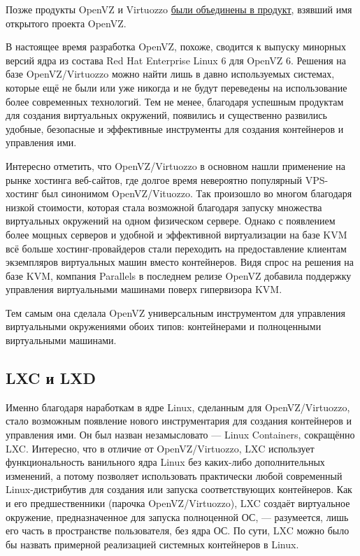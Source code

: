 \documentclass[14pt, a4paper]{article}
\begin{document}
Позже продукты OpenVZ и Virtuozzo \href{https://lists.openvz.org/pipermail/announce/2016-July/000664.html}{были объединены в продукт}, взявший имя открытого проекта
OpenVZ.

В настоящее время разработка OpenVZ, похоже, сводится к выпуску минорных версий ядра из
состава Red Hat Enterprise Linux 6 для OpenVZ 6. Решения на базе OpenVZ/Virtuozzo можно найти
лишь в давно используемых системах, которые ещё не были или уже никогда и не будут переведены
на использование более современных технологий. Тем не менее, благодаря успешным продуктам для
создания виртуальных окружений, появились и существенно развились удобные, безопасные и
эффективные инструменты для создания контейнеров и управления ими.

Интересно отметить, что OpenVZ/Virtuozzo в основном нашли применение на рынке хостинга
веб-сайтов, где долгое время невероятно популярный VPS-хостинг был синонимом OpenVZ/Vituozzo.
Так произошло во многом благодаря низкой стоимости, которая стала возможной благодаря запуску
множества виртуальных окружений на одном физическом сервере. Однако с появлением более
мощных серверов и удобной и эффективной виртуализации на базе KVM всё больше
хостинг-провайдеров стали переходить на предоставление клиентам экземпляров виртуальных
машин вместо контейнеров. Видя спрос на решения на базе KVM, компания Parallels в последнем
релизе OpenVZ добавила поддержку управления виртуальными машинами поверх гипервизора KVM.

Тем самым она сделала OpenVZ универсальным инструментом для управления виртуальными
окружениями обоих типов: контейнерами и полноценными виртуальными машинами.\\

\subsection*{LXC и LXD}

Именно благодаря наработкам в ядре Linux, сделанным для OpenVZ/Virtuozzo, стало возможным
появление нового инструментария для создания контейнеров и управления ими. Он был назван
незамысловато — Linux Containers, сокращённо LXC. Интересно, что в отличие от OpenVZ/Virtuozzo,
LXC использует функциональность ванильного ядра Linux без каких-либо дополнительных изменений,
а потому позволяет использовать практически любой современный Linux-дистрибутив для создания
или запуска соответствующих контейнеров. Как и его предшественники (парочка OpenVZ/Virtuozzo),
LXC создаёт виртуальное окружение, предназначенное для запуска полноценной ОС, — разумеется,
лишь его часть в пространстве пользователя, без ядра ОС. По сути, LXC можно было бы назвать
примерной реализацией системных контейнеров в Linux.
\end{document}
